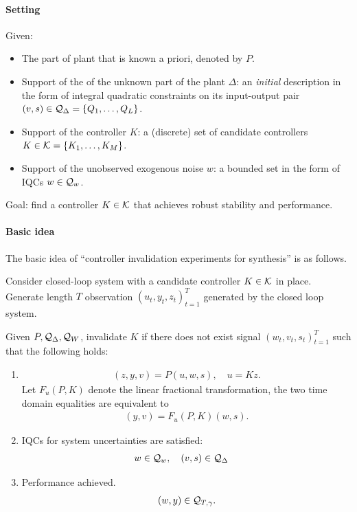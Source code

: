 \documentclass[11pt, onecolumn]{article}
\newcommand{\qq}[1]{{\color{magenta}{(#1)}}}
\begin{document}
\paragraph{Setting}
Given:
\begin{itemize}
\item The part of plant that is known a priori, denoted by $P$.
\item Support of the of the unknown part of the plant $\Delta$: an {\em initial} description in the
  form of integral quadratic constraints on its input-output pair $(v,s)\in \mathcal Q_\Delta =
  \{Q_1,\dots, Q_L\}$.
\item Support of the controller $K$: a (discrete) set of candidate controllers $K \in \mathcal K =
  \{K_1,\dots, K_M\}$.
\item Support of the unobserved exogenous noise $w$: a bounded set in the form of IQCs $w\in \mathcal
  Q_{w}$.
\end{itemize}
Goal: find a controller $K\in\mathcal K$ that achieves robust stability and performance.

\paragraph{Basic idea}
The basic idea of ``controller invalidation experiments for synthesis'' is as follows.

Consider closed-loop system with a candidate controller $K\in\mathcal K$ in place.  Generate length $T$
observation $(u_t, y_t, z_t)_{t=1}^{T}$ generated by the closed loop system.

  Given $P, \mathcal Q_{\Delta}, \mathcal Q_{W}$, invalidate $K$ if there does not exist signal $(w_t, v_t,
  s_t)_{t=1}^{T}$ such that the following holds:
\begin{enumerate}
\item
  \begin{align*} (z,y,v) = P (u,w,s), \quad u = K z.
  \end{align*}
  Let $F_u(P,K)$ denote the linear fractional transformation, the two time domain equalities are
  equivalent to
  \begin{align*} (y,v) = F_u(P,K) (w,s).
  \end{align*}

\item IQCs for system  uncertainties are satisfied:
  \begin{align*} & w\in\mathcal Q_w, \quad (v,s) \in \mathcal Q_{\Delta}
  \end{align*}

\item Performance achieved.
  \begin{align*}
    (w,y) \in \mathcal Q_{T, \gamma}.
  \end{align*}
\end{enumerate}
\qq{convex?}
\end{document}

